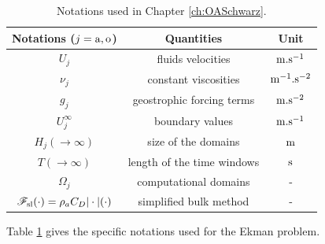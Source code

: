 \begin{table}
	\centering
\begin{tabular}{c|c|c}
	Notations ($j={\rm a}, {\rm o}$)& Quantities & Unit\\
	\hline
	$U_j$ & fluids velocities & ${\rm m}.{\rm s}^{-1}$ \\
	$\nu_j$ & constant viscosities & ${\rm m}^{-1}.{\rm s}^{-2}$\\
	$g_j$ & geostrophic forcing terms & ${\rm m}.{\rm s}^{-2}$\\
	$U_j^\infty$ & boundary values & ${\rm m}.{\rm s}^{-1}$\\
	$H_j (\rightarrow \infty)$ & size of the domains & ${\rm m}$\\
	$T(\rightarrow \infty)$ &length of the time windows &
	${\rm s}$\\
	$\Omega_j$ & computational domains & -\\
	${\cal F}_{\rm sl}(\cdot) = \rho_a C_D |\cdot|(\cdot)$ &
	simplified bulk method & -
\end{tabular}
	\caption{Notations used in Chapter \ref{ch:OASchwarz}.}
	\label{tab:airseaSCM_ekmanProblem}
\end{table}
Table \ref{tab:airseaSCM_ekmanProblem} gives the specific
notations used for the Ekman problem.

